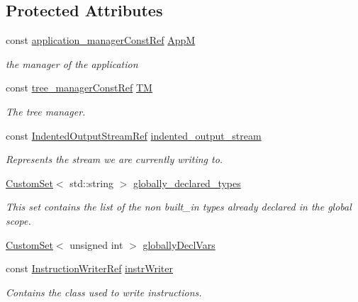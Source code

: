 \subsection*{Protected Attributes}
\begin{DoxyCompactItemize}
\item 
const \hyperlink{application__manager_8hpp_abb985163a2a3fb747f6f03b1eaadbb44}{application\+\_\+manager\+Const\+Ref} \hyperlink{classCWriter_ac1c04f158e0edaddd59a002dc11213fa}{AppM}
\begin{DoxyCompactList}\small\item\em the manager of the application \end{DoxyCompactList}\item 
const \hyperlink{tree__manager_8hpp_a792e3f1f892d7d997a8d8a4a12e39346}{tree\+\_\+manager\+Const\+Ref} \hyperlink{classCWriter_a3cfb319409e8bbf3ff53cc960afd2da7}{TM}
\begin{DoxyCompactList}\small\item\em The tree manager. \end{DoxyCompactList}\item 
const \hyperlink{indented__output__stream_8hpp_ab32278e11151ef292759c88e99b77feb}{Indented\+Output\+Stream\+Ref} \hyperlink{classCWriter_ac6d016436e065c31dd5152a7cc30e507}{indented\+\_\+output\+\_\+stream}
\begin{DoxyCompactList}\small\item\em Represents the stream we are currently writing to. \end{DoxyCompactList}\item 
\hyperlink{custom__set_8hpp_a615bc2f42fc38a4bb1790d12c759e86f}{Custom\+Set}$<$ std\+::string $>$ \hyperlink{classCWriter_a534cbafda0454f4a454c529de5b1ce03}{globally\+\_\+declared\+\_\+types}
\begin{DoxyCompactList}\small\item\em This set contains the list of the non built\+\_\+in types already declared in the global scope. \end{DoxyCompactList}\item 
\hyperlink{custom__set_8hpp_a615bc2f42fc38a4bb1790d12c759e86f}{Custom\+Set}$<$ unsigned int $>$ \hyperlink{classCWriter_a9fd0eb45bad6d32417b1802bcefe608b}{globally\+Decl\+Vars}
\item 
const \hyperlink{instruction__writer_8hpp_a40ea26c38a2909ba48f88f997144b260}{Instruction\+Writer\+Ref} \hyperlink{classCWriter_af4be3a067b016eb97f15c89fa98088f3}{instr\+Writer}
\begin{DoxyCompactList}\small\item\em Contains the class used to write instructions. \end{DoxyCompactList}\item 

\end{DoxyCompactItemize}
